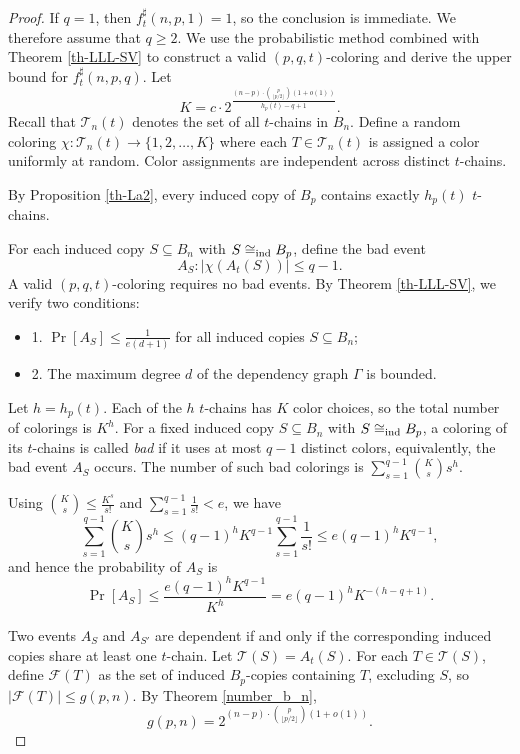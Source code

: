 \documentclass[twoside,12pt]{article}
\begin{document}
\begin{proof}
If \(q=1\), then \(f_t^{\sharp}(n,p,1)=1\), so the conclusion is immediate. We therefore assume that \(q \geq 2\).
We use the probabilistic method combined with Theorem \ref{th-LLL-SV} to construct a valid \((p,q,t)\)-coloring and derive the upper bound for \(f_t^{\sharp}(n,p,q)\). Let
$$
K=c \cdot 2^{\frac{(n - p) \cdot \binom{p}{\lfloor p/2 \rfloor}(1+o(1))}{h_p(t) - q + 1}}.
$$
Recall that \(\mathcal{T}_n(t)\) denotes the set of all \(t\)-chains in \(B_n\).  Define a random coloring \(\chi: \mathcal{T}_n(t) \to \{1, 2, \dots, K\}\) where each \(T \in \mathcal{T}_n(t)\) is assigned a color uniformly at random. Color assignments are independent across distinct \(t\)-chains.

By Proposition \ref{th-La2}, every induced copy of $B_p$ contains exactly $h_p(t)$ $t$-chains.

For each induced copy \(S\subseteq B_n\) with \(S\cong_{\rm ind} B_p\), define the bad event
\[
A_S: |\chi(A_t(S))| \leq q-1.
\]
A valid \((p,q,t)\)-coloring requires no bad events.
By Theorem \ref{th-LLL-SV}, we verify two conditions:
\begin{itemize}
    \item[]  1. \(\Pr[A_S] \leq \frac{1}{e(d + 1)}\) for all induced copies \(S\subseteq B_n\);
\item[]  2. The maximum degree \(d\) of the dependency graph \(\Gamma\) is bounded.
\end{itemize}

Let \(h = h_p(t)\).
Each of the \(h\) \(t\)-chains has \(K\) color choices, so the total number of colorings is $K^h$.
For a fixed induced copy $S\subseteq B_n$ with $S\cong_{\rm ind} B_p$, a coloring of its $t$-chains is called \textit{bad} if it uses at most $q-1$ distinct colors, equivalently, the bad event $A_S$ occurs.
The number of such bad colorings is
$\sum_{s=1}^{q-1}\binom{K}{s} s^h.$

Using \(\binom{K}{s} \leq \frac{K^s}{s!}\) and \(\sum_{s=1}^{q-1} \frac{1}{s!} < e\), we have
\[
\sum_{s=1}^{q-1} \binom{K}{s} s^h \leq (q-1)^h K^{q-1} \sum_{s=1}^{q-1} \frac{1}{s!} \leq e (q-1)^h K^{q-1},
\]
and hence
the probability of \(A_S\) is
\begin{equation}\label{eq:prob-bad-event}
\Pr[A_S] \leq \frac{e (q-1)^h K^{q-1}}{K^h} = e (q-1)^h K^{-(h - q + 1)}.
\end{equation}

Two events \(A_S\) and \(A_{S'}\) are dependent if and only if the corresponding induced copies share at least one \(t\)-chain.
Let \(\mathcal{T}(S)=A_t(S)\). For each \(T \in \mathcal{T}(S)\), define \(\mathcal{F}(T)\) as the set of induced \(B_p\)-copies containing \(T\), excluding \(S\), so \(|\mathcal{F}(T)| \leq g(p,n)\).
By Theorem \ref{number_b_n},
\begin{equation}\label{eq:bound-n-t}
g(p,n)= 2^{(n - p) \cdot \binom{p}{\lfloor p/2 \rfloor}(1+o(1))}.
\end{equation}


\end{proof}
\end{document}
